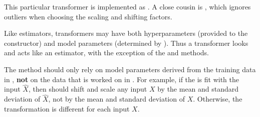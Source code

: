 This particular transformer is implemented as .
A close cousin is , which ignores outliers when choosing the scaling and shifting factors.

Like estimators, transformers may have both hyperparameters (provided to the constructor) and model parameters (determined by ).
Thus a transformer looks and acts like an estimator, with the exception of the  and  methods.

\begin{warn}
The  method should only rely on model parameters derived from the training data in , \textbf{not} on the data that is worked on in .
For example, if the  is fit with the input $\widehat{X}$, then  should shift and scale any input $X$ by the mean and standard deviation of $\widehat{X}$, not by the mean and standard deviation of $X$.
Otherwise, the transformation is different for each input $X$.
\end{warn}

